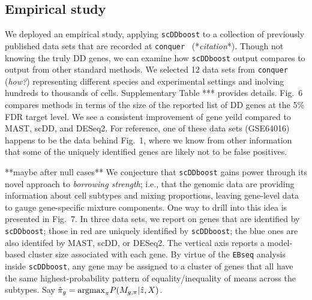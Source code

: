 \documentclass[aoas,preprint]{imsart}
\begin{document}
\subsection{Empirical study}

We deployed an empirical study, applying \verb+scDDboost+ to a collection of previously published
data sets that are recorded at \verb+conquer+~\citep{ref:Cq} (*{\em citation}*).  Though not knowing the truly DD
genes, we can examine how \verb+scDDboost+ output compares to output from other standard methods.  We selected
12 data sets from \verb+conquer+  ({\em how?}) representing different species and experimental settings
and inolving hundreds to thousands of cells.   Supplementary Table *** provides details.  Fig.~6 compares
methods in terms of the size of the reported list of DD genes at the 5\% FDR target level.  
We see a consistent improvement of gene yeild compared to MAST, scDD, and DESeq2.  For reference, one of these data 
sets (GSE64016) happens to be the data behind Fig.~1, where we know from other information that some
of the uniquely identified genes are likely not to be false positives.

**maybe after null cases**
We conjecture that \verb+scDDboost+  gains power through its novel approach to {\em borrowing strength}; 
i.e., that the genomic data are providing information about cell subtypes and mixing proportions, 
leaving gene-level data to gauge gene-specific mixture components.   One way to drill into this
idea  is presented in Fig.~7.  In three data sets, we report on genes that are
 identified by \verb+scDDboost+; those in red are uniquely identified by \verb+scDDboost+; the blue ones
are also identifed by MAST, scDD, or DESeq2.  The vertical axis reports a model-based cluster size associated
with each gene.  By virtue of the \verb+EBseq+ analysis inside \verb+scDDboost+, any gene may be assigned to
a cluster of genes that all have the same highest-probability pattern of equality/inequality of means across
the subtypes. Say $\hat \pi_g = {\rm argmax}_{\pi} P( M_{g,\pi} | \hat z, X)$. 


\end{document}

